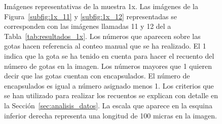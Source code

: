 \begin{figure}[H]
  \begin{center} 
  
      

  \end{center}
  \vspace{-5mm}    
  \caption{\small Imágenes representativas de la muestra 1x. Las imágenes de la Figura~\ref{subfig:1x_11} y \ref{subfig:1x_12} representadas se corresponden con las imágenes llamadas 11 y 12 del a Tabla~\ref{tab:resultados_1x}. Los números que aparecen sobre las gotas hacen referencia al conteo manual que se ha realizado. El 1 indica que la gota se ha tenido en cuenta para hacer el recuento del número de gotas en la imagen. Los números mayores que 1 quieren decir que las gotas cuentan con encapsulados. El número de encapsulados es igual a número asignado menos 1. Los criterios que se han utilizado para realizar los recuentos se explican con detalle en la Sección~\ref{sec:analisis_datos}. La escala que aparece en la esquina inferior derecha representa una longitud de 100 micras en la imagen. }
  \label{fig:imagenes_1x}
\end{figure}



